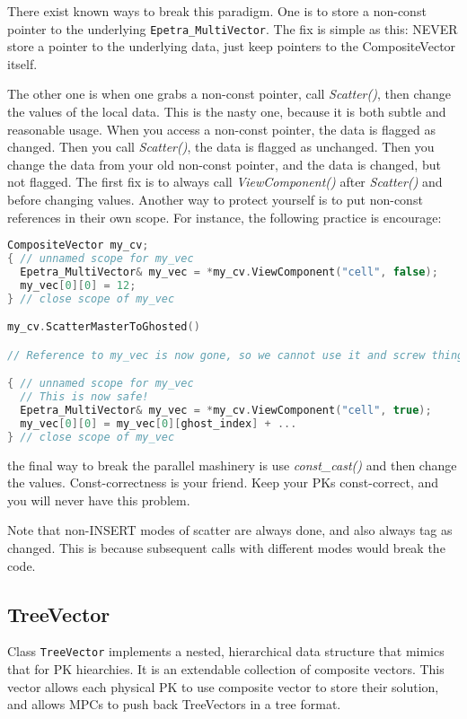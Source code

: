 There exist known ways to break this paradigm. 
One is to store a non-const pointer to the underlying {\tt Epetra\_MultiVector}.
The fix is simple as this: NEVER store a pointer to the underlying data, 
just keep pointers to the CompositeVector itself.

The other one is when one grabs a non-const pointer, call {\it Scatter()}, then 
change the values of the local data.  
This is the nasty one, because it is both subtle and reasonable usage.
When you access a non-const pointer, the data is flagged as changed.
Then you call {\it Scatter()}, the data is flagged as unchanged.
Then you change the data from your old non-const pointer, and the data is changed, but not flagged.
The first fix is to always call {\it ViewComponent()} after {\it Scatter()} and before changing values.
Another way to protect yourself is to put non-const references in their own scope.
For instance, the following practice is encourage:
\begin{lstlisting}[language=C++]
CompositeVector my_cv;
{ // unnamed scope for my_vec
  Epetra_MultiVector& my_vec = *my_cv.ViewComponent("cell", false);
  my_vec[0][0] = 12;
} // close scope of my_vec

my_cv.ScatterMasterToGhosted()

// Reference to my_vec is now gone, so we cannot use it and screw things up!

{ // unnamed scope for my_vec
  // This is now safe!
  Epetra_MultiVector& my_vec = *my_cv.ViewComponent("cell", true);
  my_vec[0][0] = my_vec[0][ghost_index] + ...
} // close scope of my_vec
\end{lstlisting}

the final way to break the parallel mashinery is use {\it const\_cast()} and 
then change the values.
Const-correctness is your friend. Keep your PKs const-correct, and you will never have this problem.

Note that non-INSERT modes of scatter are always done, and also always tag as changed.  
This is because subsequent calls with different modes would break the code.


\subsection{TreeVector}
Class {\tt TreeVector} implements a nested, hierarchical data structure 
that mimics that for PK hiearchies.
It is an extendable collection of composite vectors.
This vector allows each physical PK to use composite vector to store 
their solution, and allows MPCs to push back TreeVectors in a tree format.

